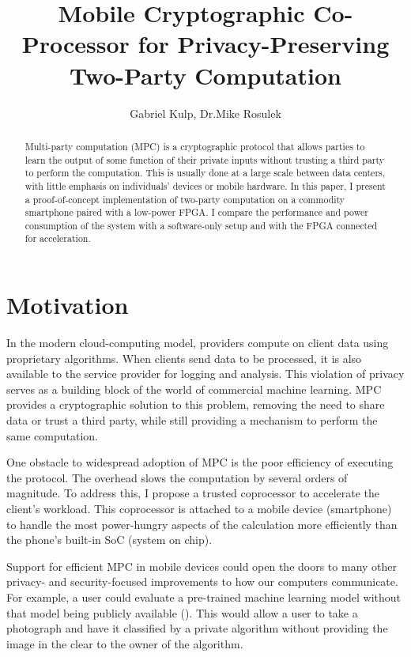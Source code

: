 \documentclass[letterpaper]{article}
\author{Gabriel Kulp, Dr.\@ Mike Rosulek}
\title{Mobile Cryptographic Co-Processor for Privacy-Preserving Two-Party Computation}
\begin{document}
\maketitle

\nocite{YaoGC,FirstOT,Fairplay,FreeXOR,HalfGates,TinyGarble,NeuralNets}

\begin{abstract}
Multi-party computation (MPC) is a cryptographic protocol that allows parties to learn the output of some function of their private inputs without trusting a third party to perform the computation. This is usually done at a large scale between data centers, with little emphasis on individuals' devices or mobile hardware. In this paper, I present a proof-of-concept implementation of two-party computation on a commodity smartphone paired with a low-power FPGA\@. I compare the performance and power consumption of the system with a software-only setup and with the FPGA connected for acceleration.
\end{abstract}

\section{Motivation}
In the modern cloud-computing model, providers compute on client data using proprietary algorithms. When clients send data to be processed, it is also available to the service provider for logging and analysis. This violation of privacy serves as a building block of the world of commercial machine learning. MPC provides a cryptographic solution to this problem, removing the need to share data or trust a third party, while still providing a mechanism to perform the same computation.

One obstacle to widespread adoption of MPC is the poor efficiency of executing the protocol. The overhead slows the computation by several orders of magnitude. To address this, I propose a trusted coprocessor to accelerate the client's workload. This coprocessor is attached to a mobile device (smartphone) to handle the most power-hungry aspects of the calculation more efficiently than the phone's built-in SoC (system on chip).

Support for efficient MPC in mobile devices could open the doors to many other privacy- and security-focused improvements to how our computers communicate. For example, a user could evaluate a pre-trained machine learning model without that model being publicly available (\cite{NeuralNets}). This would allow a user to take a photograph and have it classified by a private algorithm without providing the image in the clear to the owner of the algorithm.
\end{document}
